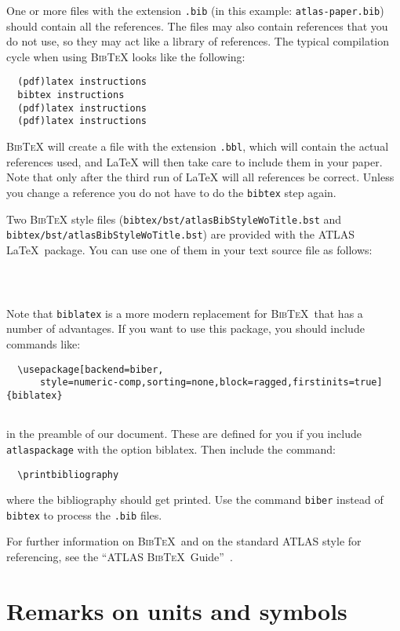 \documentclass[UKenglish]{latex/atlasdoc}
\newcommand{\Option}[1]{\textsf{#1}\xspace}
\newcommand{\Package}[1]{\texttt{#1}\xspace}
\newcommand{\BibTeX}{\textsc{Bib\TeX}}
\begin{document}
One or more files with the extension \texttt{.bib} 
(in this example: \texttt{atlas-paper.bib}) should contain all the references. 
The files may also contain references that you do not use, so they may act like a
library of references. 
The typical compilation cycle when using \BibTeX{} looks like the following:
%
\begin{verbatim}
  (pdf)latex instructions
  bibtex instructions
  (pdf)latex instructions
  (pdf)latex instructions
\end{verbatim}
%
\BibTeX{} will create a file with the extension \texttt{.bbl}, which will
contain the actual references used, and \LaTeX{} will then take care
to include them in your paper. Note that only after the third run of
\LaTeX{} will all references be correct. Unless you change a reference
you do not have to do the \texttt{bibtex} step again.

Two \BibTeX{} style files 
(\texttt{bibtex/bst/atlasBibStyleWoTitle.bst} and\\
\texttt{bibtex/bst/atlasBibStyleWoTitle.bst})
are provided with the ATLAS \LaTeX\ package. 
You can use one of them in your text source file as follows:
%
\begin{verbatim}
  
  
\end{verbatim}

Note that \texttt{biblatex} is a more modern replacement for \BibTeX\ that has a number of advantages.
If you want to use this package, you should include commands like:
%
\begin{verbatim}
  \usepackage[backend=biber,
	  style=numeric-comp,sorting=none,block=ragged,firstinits=true]{biblatex}
  
\end{verbatim}
%
in the preamble of our document.
These are defined for you if you include \Package{atlaspackage} with the option \Option{biblatex}.
Then include the command:
%
\begin{verbatim}
  \printbibliography
\end{verbatim}
%
where the bibliography should get printed.
Use the command \texttt{biber} instead of \texttt{bibtex} to process the \texttt{.bib} files.

For further information on \BibTeX\ and on the standard ATLAS style for referencing, 
see the ``ATLAS \BibTeX\ Guide''~\cite{atlas-bibtex}.


\section{Remarks on units and symbols}
\label{sec:units}
\end{document}
